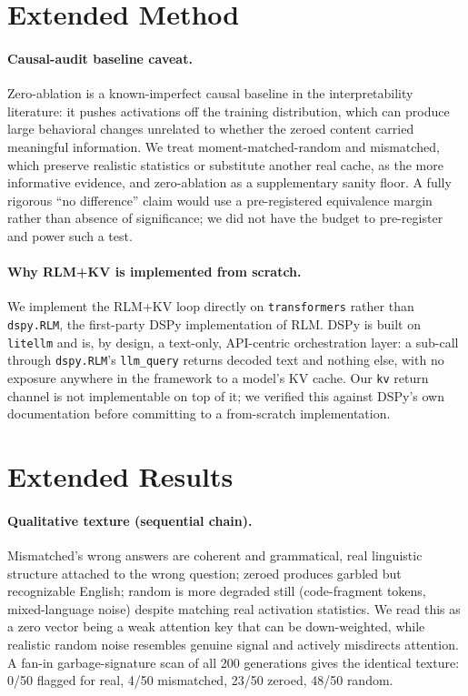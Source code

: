 \documentclass[11pt]{article}
\begin{document}
\section{Extended Method}
\label{app:method-ext}

\paragraph{Causal-audit baseline caveat.} Zero-ablation is a
known-imperfect causal baseline in the interpretability literature: it
pushes activations off the training distribution, which can produce
large behavioral changes unrelated to whether the zeroed content
carried meaningful information. We treat moment-matched-random and
mismatched, which preserve realistic statistics or substitute another
real cache, as the more informative evidence, and zero-ablation as a
supplementary sanity floor. A fully rigorous ``no difference'' claim
would use a pre-registered equivalence margin rather than absence of
significance; we did not have the budget to pre-register and power such
a test.

\paragraph{Why RLM+KV is implemented from scratch.} We implement the
RLM+KV loop directly on \texttt{transformers} \citep{transformers2020}
rather than \texttt{dspy.RLM}, the first-party DSPy implementation of
RLM. DSPy is built on \texttt{litellm} and is, by design, a text-only,
API-centric orchestration layer: a sub-call through \texttt{dspy.RLM}'s
\texttt{llm\_query} returns decoded text and nothing else, with no
exposure anywhere in the framework to a model's KV cache. Our
\texttt{kv} return channel is not implementable on top of it; we
verified this against DSPy's own documentation before committing to a
from-scratch implementation.

\section{Extended Results}
\label{app:results-ext}

\paragraph{Qualitative texture (sequential chain).} Mismatched's wrong
answers are coherent and grammatical, real linguistic structure
attached to the wrong question; zeroed produces garbled but
recognizable English; random is more degraded still (code-fragment
tokens, mixed-language noise) despite matching real activation
statistics. We read this as a zero vector being a weak attention key
that can be down-weighted, while realistic random noise resembles
genuine signal and actively misdirects attention. A fan-in
garbage-signature scan of all 200 generations gives the identical
texture: 0/50 flagged for real, 4/50 mismatched, 23/50 zeroed, 48/50
random.
\end{document}
